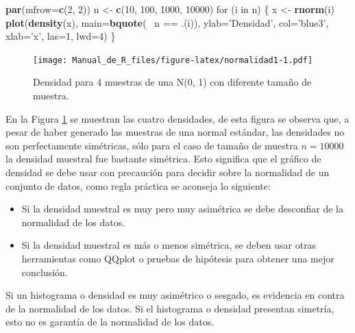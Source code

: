 \documentclass[10pt,]{krantz}
\makeatletter
\newenvironment{Shaded}{\begin{snugshade}}{\end{snugshade}}
\newcommand{\KeywordTok}[1]{\textcolor[rgb]{0.13,0.29,0.53}{\textbf{{#1}}}}
\newcommand{\DataTypeTok}[1]{\textcolor[rgb]{0.13,0.29,0.53}{{#1}}}
\newcommand{\DecValTok}[1]{\textcolor[rgb]{0.00,0.00,0.81}{{#1}}}
\newcommand{\StringTok}[1]{\textcolor[rgb]{0.31,0.60,0.02}{{#1}}}
\newcommand{\NormalTok}[1]{{#1}}
\providecommand{\tightlist}{%
  \setlength{\itemsep}{0pt}\setlength{\parskip}{0pt}}
\newenvironment{kframe}{%
\medskip{}
\setlength{\fboxsep}{.8em}
 \def\at@end@of@kframe{}%
 \ifinner\ifhmode%
  \def\at@end@of@kframe{\end{minipage}}%
  \begin{minipage}{\columnwidth}%
 \fi\fi%
 \def\FrameCommand##1{\hskip\@totalleftmargin \hskip-\fboxsep
 \colorbox{shadecolor}{##1}\hskip-\fboxsep
     \hskip-\linewidth \hskip-\@totalleftmargin \hskip\columnwidth}%
 \MakeFramed {\advance\hsize-\width
   \@totalleftmargin\z@ \linewidth\hsize
   \@setminipage}}%
 {\par\unskip\endMakeFramed%
 \at@end@of@kframe}
\renewenvironment{Shaded}{\begin{kframe}}{\end{kframe}}
\let\BeginKnitrBlock\begin \let\EndKnitrBlock\end
\makeatother
\begin{document}
\begin{Shaded}
\begin{Highlighting}[]
\KeywordTok{par}\NormalTok{(}\DataTypeTok{mfrow=}\KeywordTok{c}\NormalTok{(}\DecValTok{2}\NormalTok{, }\DecValTok{2}\NormalTok{))}
\NormalTok{n <-}\StringTok{ }\KeywordTok{c}\NormalTok{(}\DecValTok{10}\NormalTok{, }\DecValTok{100}\NormalTok{, }\DecValTok{1000}\NormalTok{, }\DecValTok{10000}\NormalTok{)}
\NormalTok{for (i in n) \{}
  \NormalTok{x <-}\StringTok{ }\KeywordTok{rnorm}\NormalTok{(i)}
  \KeywordTok{plot}\NormalTok{(}\KeywordTok{density}\NormalTok{(x), }\DataTypeTok{main=}\KeywordTok{bquote}\NormalTok{(~}\StringTok{ }\NormalTok{n ==}\StringTok{ }\NormalTok{.(i)),}
       \DataTypeTok{ylab=}\StringTok{'Densidad'}\NormalTok{, }\DataTypeTok{col=}\StringTok{'blue3'}\NormalTok{, }\DataTypeTok{xlab=}\StringTok{'x'}\NormalTok{, }\DataTypeTok{las=}\DecValTok{1}\NormalTok{, }\DataTypeTok{lwd=}\DecValTok{4}\NormalTok{)}
\NormalTok{\}}
\end{Highlighting}
\end{Shaded}

\begin{figure}[htbp]
\centering
\texttt{[image: Manual\_de\_R\_files/figure-latex/normalidad1-1.pdf]}
\caption{\label{fig:normalidad1}Densidad para 4 muestras de una N(0, 1) con
diferente tamaño de muestra.}
\end{figure}

En la Figura \ref{fig:normalidad1} se muestran las cuatro densidades, de
esta figura se observa que, a pesar de haber generado las muestras de
una normal estándar, las densidades no son perfectamente simétricas,
sólo para el caso de tamaño de muestra \(n=10000\) la densidad muestral
fue bastante simétrica. Esto significa que el gráfico de densidad se
debe usar con precaución para decidir sobre la normalidad de un conjunto
de datos, como regla práctica se aconseja lo siguiente:

\begin{itemize}
\tightlist
\item
  Si la densidad muestral es muy pero muy asimétrica se debe desconfiar
  de la normalidad de los datos.
\item
  Si la densidad muestral es más o menos simétrica, se deben usar otras
  herramientas como QQplot o pruebas de hipótesis para obtener una mejor
  conclusión.
\end{itemize}

\BeginKnitrBlock{rmdwarning}
Si un histograma o densidad es muy asimétrico o sesgado, es evidencia en
contra de la normalidad de los datos. Si el histograma o densidad
presentan simetría, esto no es garantía de la normalidad de los datos.
\EndKnitrBlock{rmdwarning}
\end{document}
